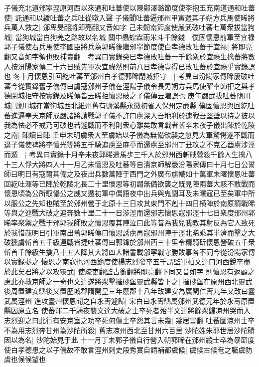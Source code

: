 子儀充北道邠寜涇原河西以來通和吐蕃使以陳鄭澤潞節度使李抱玉充南道通和吐蕃使|{
	託通和以緩吐蕃之兵吐從暾入聲}
子儀聞吐蕃逼邠州甲寅遣其子朔方兵馬使晞將兵萬人救之|{
	邠卑旻翻將即亮翻又音如字}
己未劒南節度使嚴武破吐蕃七萬衆拔當狗城|{
	當狗城當白狗羌之路故以名城}
關中蟲蝗霖雨米斗千餘錢　僕固懷恩前軍至宜禄郭子儀使右兵馬使李國臣將兵為郭晞後繼邠寜節度使白孝德敗吐蕃于宜禄|{
	將即亮翻又音如字領也敗補賣翻　考異曰實錄癸巳孝德敗吐蕃一千餘衆於宜祿生擒蕃將數人按汾陽家傳二十六日賊先軍次宜祿然則前八日孝德豈得已敗吐蕃於宜祿乎實錄誤也}
冬十月懷恩引回紇吐蕃至邠州白孝德郭晞閉城拒守　|{
	考異曰汾陽家傳晞屢破吐蕃今從實錄舊子儀傳曰虜寇邠州子儀在涇陽子儀令長男朔方兵馬使曜率師拒之與孝德閉城拒守按實錄及晞傳皆云晞拒懷恩破之子儀傳云曜誤也}
庚午嚴武拔吐蕃鹽川城|{
	鹽川城在當狗城西北維州舊有鹽溪縣永徽初省入保州定亷縣}
僕固懷恩與回紇吐蕃進逼奉天京師戒嚴諸將請戰郭子儀不許曰虜深入吾地利於速戰吾堅壁以待之彼以我為怯必不戒乃可破也若遽戰而不利則衆心離矣敢言戰者斬辛未夜子儀出陳於乾陵之南|{
	陳讀曰陣}
壬申未明虜衆大至虜始以子儀為無備欲襲之忽見大軍驚愕遂不戰而退子儀使禆將李懷光等將五千騎追虜至麻亭而還虜至邠州丁丑攻之不克乙酉虜涉涇而遁　|{
	考異曰實錄十月辛未夜郭晞遣馬步三千人於邠州西斬賊營殺千餘人生擒八十三人俘大將四人十一月乙未懷恩及吐蕃等自潰京師解嚴汾陽家傳曰十月七日公誓師曰明日有寇爾其備之及夜出兵數萬陣于西門之外廣布旗幟如十萬軍未曙懷恩吐蕃回紇吐渾等已陣於乾陵北長二十里懷恩等初謂無備欲襲之既見陣兩蕃大駭不敢戰而懷恩頃為公所馭懾公之威又遁初軍中偶語夜中出兵與鬼闘耳及未曙寇已至矣軍中所以服公之先知也賊至於邠州營于北原十三日攻其東門不剋十四日横陣於南原請戰晞等與之連戰大破之追奔數十里二十一日涉涇而還邠志懷恩寇邠涇十七日衆度邠州郭晞率衆禦之戰于邠郭我師敗之懷恩覆其陣泣曰此等昔為我兒我教其射反為它人致死於我惜哉明日引軍南出舊郭晞傳曰懷恩誘虜再寇邠州陣于涇北晞乘其半濟而擊之大破獯虜斬首五千級連戰皆捷吐蕃傳曰郭鋒於邠州西三十里令精騎斫懷恩營破五千衆斬首千餘級生擒八十五人降其大將四人諸書載邠寜戰守勝敗事各不同今從汾陽家傳以實録参之}
懷恩之南寇也河西節度使楊志烈發卒五千謂監軍柏文達曰河西銳卒盡於此矣君將之以攻靈武|{
	使疏吏翻監古銜翻將即亮翻下同又音如字}
則懷恩有返顧之慮此亦救京師之一奇也文達遂將衆擊摧砂堡靈武縣皆下之|{
	摧砂堡在原州西北靈武後周置建安縣後又置歷城郡隋開皇三年廢郡十八年改建安為廣閏仁夀九年又改曰靈武属涇州}
進攻靈州懷恩聞之自永夀遽歸|{
	宋白曰永夀縣属邠州武德元年於永壽原置縣因原立名}
使蕃渾二千騎夜襲文達大破之士卒死者殆半文達將餘衆歸凉州哭而入志烈迎之曰此行有安京室之功卒死何傷士卒怨其言未幾|{
	幾居豈翻}
吐蕃圍涼州士卒不為用志烈奔甘州為沙陀所殺|{
	舊志凉州西北至甘州六百里}
沙陀姓朱耶世居沙陀磧因以為名|{
	沙陀始見于此}
十一月丁未郭子儀自行營入朝郭晞在邠州縱士卒為暴節度使白孝德患之以子儀故不敢言涇州刺史段秀實自請補都虞候|{
	虞候古候奄之職虞防虞也候候望也}
